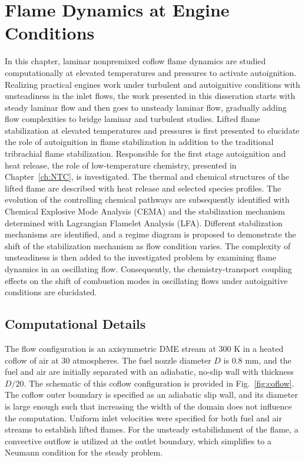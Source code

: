 \chapter{Flame Dynamics at Engine Conditions}\label{ch:dynamics}

In this chapter, laminar nonpremixed coflow flame dynamics are studied computationally at elevated temperatures and pressures to activate autoignition.  Realizing practical engines work under turbulent and autoignitive conditions with unsteadiness in the inlet flows, the work presented in this disseration starts with steady laminar flow and then goes to unsteady laminar flow, gradually adding flow complexities to bridge laminar and turbulent studies.  Lifted flame stabilization at elevated temperatures and pressures is first presented to elucidate the role of autoignition in flame stabilization in addition to the traditional tribrachial flame stabilization.  Responsible for the first stage autoignition and heat release, the role of low-temperature chemistry, presented in Chapter~\ref{ch:NTC}, is investigated.  The thermal and chemical structures of the lifted flame are described with heat release and selected species profiles.  The evolution of the controlling chemical pathways are subsequently identified with Chemical Explosive Mode Analysis (CEMA) and the stabilization mechanism determined with Lagrangian Flamelet Analysis (LFA).  Different stabilization mechanisms are identified, and a regime diagram is proposed to demonstrate the shift of the stabilization mechanism as flow condition varies.  The complexity of unsteadiness is then added to the investigated problem by examining flame dynamics in an oscillating flow.  Consequently, the chemistry-transport coupling effects on the shift of combustion modes in oscillating flows under autoignitive conditions are elucidated.

\section{Computational Details} \label{sec:dynamics-computation}

The flow configuration is an axisymmetric DME stream at $300$ K in a heated coflow of air at $30$ atmospheres.  The fuel nozzle diameter $D$ is $0.8$ mm, and the fuel and air are initially separated with an adiabatic, no-slip wall with thickness $D/20$.  The schematic of this coflow configuration is provided in Fig.~\ref{fig:coflow}.  The coflow outer boundary is specified as an adiabatic slip wall, and its diameter is large enough such that increasing the width of the domain does not influence the computation.  Uniform inlet velocities were specified for both fuel and air streams to establish lifted flames.  For the unsteady estabilishment of the flame, a convective outflow is utilized at the outlet boundary, which simplifies to a Neumann condition for the steady problem.

